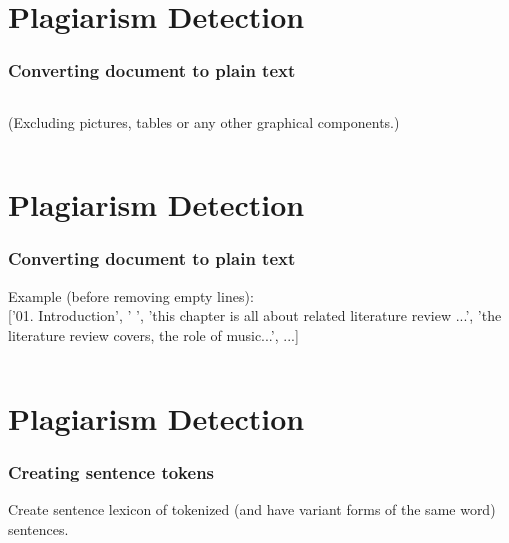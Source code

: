 \documentclass[t]{beamer}
\begin{document}
\section{Plagiarism Detection}
\begin{frame}
	\frametitle{Converting document to plain text}
	
	
	\inputminted[firstline=14, 
	lastline=17, 
	frame=lines,
	fontsize=\footnotesize
	]{python}{../pumas/docxToText.py}
	
	(Excluding pictures, tables or any other graphical components.)
	
	\inputminted[firstline=19, 
	lastline=25, 
	frame=lines,
	fontsize=\footnotesize
	]{python}{../pumas/docxToText.py}
	
	
\end{frame}


\section{Plagiarism Detection}
\begin{frame}
	\frametitle{Converting document to plain text}
	
	Example {\tiny (before removing empty lines)}:\\
	
	['01. Introduction', ' ', 'this chapter is all about related literature review ...', 'the literature review covers,
	 the role of music...', ...]
	 
	 \inputminted[firstline=27, 
	 lastline=37, 
	 frame=lines,
	 fontsize=\footnotesize
	 ]{python}{../pumas/docxToText.py}
	
	
\end{frame}




\section{Plagiarism Detection}
\begin{frame}
	\frametitle{Creating sentence tokens}
	
	Create sentence lexicon of tokenized (and have variant forms of the same word) sentences.
	
	\inputminted[firstline=79, 
	lastline=94, 
	frame=lines,
	fontsize=\footnotesize
	]{python}{../pumas/docxToText.py}	
	
\end{frame}
\end{document}
